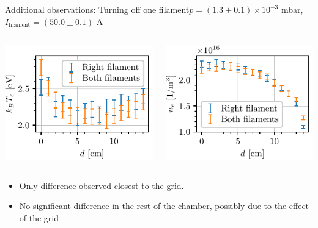 \documentclass[10pt]{beamer}
\newcommand{\filamentcurrent}{\ensuremath{I_{\mathrm{filament}}}}
\begin{document}
\begin{frame}{Additional observations: Turning off one filament}{$p = (1.3 \pm 0.1) \times 10^{-3}$ mbar, $\filamentcurrent = (50.0 \pm 0.1)$ A}
    \begin{columns}
        \centering
        \includegraphics[scale=1]{../figures/temperatureeV_position_twofilaments.pdf}

        \centering
        \includegraphics[scale=1]{../figures/density_position_twofilaments.pdf}

    \end{columns}
    \vspace{0.5cm}
    \begin{itemize}
        \item Only difference observed closest to the grid.
        \item No significant difference in the rest of the chamber, possibly due to the effect of the grid
    \end{itemize}
\end{frame}
\end{document}
